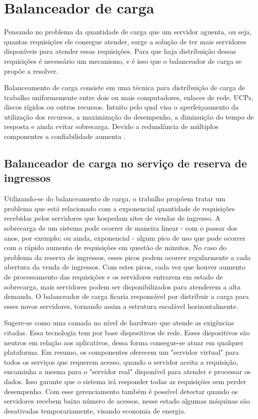 \chapter{Balanceador de carga}\label{balanceador-de-carga}

Pensando no problema da quantidade de carga que um servidor aguenta, ou seja, quantas requisições ele consegue atender,
surge a solução de ter mais servidores disponíveis para atender essas requisições.
Para que haja distribuição dessas requisições é necessário um mecanismo, e é isso que o balanceador de carga se
propõe a resolver.

\begin{citacao}
Balanceamento de carga consiste em uma técnica para distribuição de carga de trabalho uniformemente entre dois ou mais
computadores, enlaces de rede, UCPs, discos rígidos ou outros recursos. Intuito pelo qual visa o aperfeiçoamento da
utilização dos recursos, a maximização do desempenho, a diminuição do tempo de resposta e ainda evitar sobrecarga.
Devido a redundância de múltiplos componentes a confiabilidade
aumenta \cite{o-que-e-e-para-que-serve-o-balanceamento-de-carga}.
\end{citacao}


\section{Balanceador de carga no serviço de reserva de ingressos}

Utilizando-se do balanceamento de carga, o trabalho propõem tratar um problema que está relacionado com a exponencial
quantidade de requisições recebidas pelos servidores que hospedam sites de vendas de ingresso. A sobrecarga de um
sistema pode ocorrer de maneira linear - com o passar dos anos, por exemplo; ou ainda, exponencial - algum pico de uso
que pode ocorrer com o rápido aumento de requisições em questão de minutos.
No caso do problema da reserva de ingressos, esses picos podem ocorrer regularmente a cada abertura da venda de ingressos.
Com estes picos, cada vez que houver aumento de processamento das requisições e os servidores entrarem em
estado de sobrecarga, mais servidores podem ser disponibilizados para atenderem a alta demanda.
O balanceador de carga ficaria responsável por distribuir a carga para esses novos servidores,
tornando assim a estrutura escalável horizontalmente.

Sugere-se como uma camada no nível de hardware que atende as exigências citadas.
Essa tecnologia tem por base dispositivos de rede. Esses dispositivos são neutros em relação aos aplicativos, dessa forma
consegue-se atuar em qualquer plataforma. Em resumo, os componentes oferecem um "servidor virtual" para todos os serviços
que requerem acesso, quando o servidor aceita a requisição, encaminha a mesma para o "servidor real" disponível para atender
e processar os dados.
Isso garante que o sistema irá responder todas as requisições sem perder desempenho.
Com esse gerenciamento também é possível detectar quando os servidores recebem baixo número de acessos, nesse
estado algumas máquinas são desativadas temporariamente, visando economia de energia.


